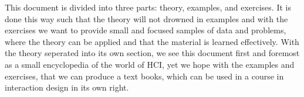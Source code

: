 This document is divided into three parts: theory, examples, and exercises. It is done this way such that the theory will not drowned in examples and with the exercises we want to provide small and focused samples of data and problems, where the theory can be applied and that the material is learned effectively. With the theory seperated into its own section, we see this document first and foremost as a small encyclopedia of the world of HCI, yet we hope with the examples and exercises, that we can produce a text books, which can be used in a course in interaction design in its own right.

